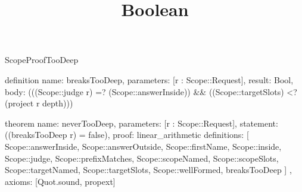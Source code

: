 \begin{lexlean}{ScopeProofTooDeep}
\title{Boolean}
\begin{semanticmodule}
definition{
  name: breaksTooDeep,
  parameters: [r : Scope::Request],
  result: Bool,
  body: (((Scope::judge r) =? (Scope::answerInside)) && ((Scope::targetSlots) <? (project r depth)))
}

theorem{
  name: neverTooDeep,
  parameters: [r : Scope::Request],
  statement: ((breaksTooDeep r) = false),
  proof: linear_arithmetic{
    definitions: [
      Scope::answerInside,
      Scope::answerOutside,
      Scope::firstName,
      Scope::inside,
      Scope::judge,
      Scope::prefixMatches,
      Scope::scopeNamed,
      Scope::scopeSlots,
      Scope::targetNamed,
      Scope::targetSlots,
      Scope::wellFormed,
      breaksTooDeep
    ]
  },
  axioms: [Quot.sound, propext]
}
\end{semanticmodule}
\end{lexlean}

